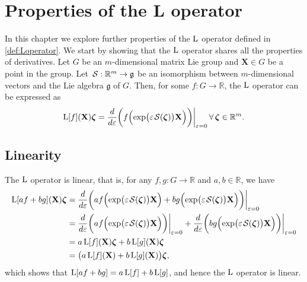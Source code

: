 \chapter{Properties of the L operator}\label{app:properties-L-op}
In this chapter we explore further properties of the $\operatorname{L}$ operator defined in \cref{def:Loperator}. We start by showing that the $\operatorname{L}$ operator shares all the properties of derivatives. Let $G$ be an $m$-dimensional matrix Lie group and $\mathbf{X}\in G$ be a point in the group. Let $\SL:\mathbb{R}^m\to\mathfrak{g}$ be an isomorphism between $m$-dimensional vectors and the Lie algebra $\mathfrak{g}$ of $G$. Then, for some $f:G\to \mathbb{R}$, the $\operatorname{L}$ operator can be expressed as
\begin{align}
    \Lop[f](\mathbf{X})\boldsymbol{\zeta} = \frac{d}{d\varepsilon}\biggl(f\Bigl(\exp\bigl(\varepsilon\SL[\boldsymbol{\zeta}]\bigr)\mathbf{X}\Bigr)\biggr)\biggr|_{\varepsilon=0}\,\forall\,\boldsymbol{\zeta}\in\mathbb{R}^m. \label{eq:appendix-prop-Lop-definition-L}
\end{align}
\section{Linearity}
The $\operatorname{L}$ operator is linear, that is, for any $f,g:G\to \mathbb{R}$ and $a,b\in\mathbb{R}$, we have
\begin{align}
    \begin{split}
        \Lop[a f + b g](\mathbf{X})\boldsymbol{\zeta} &= \frac{d}{d\varepsilon}\biggl(a f\Bigl(\exp\bigl(\varepsilon\SL[\boldsymbol{\zeta}]\bigr)\mathbf{X}\Bigr) + b g\Bigl(\exp\bigl(\varepsilon\SL[\boldsymbol{\zeta}]\bigr)\mathbf{X}\Bigr)\biggr)\biggr|_{\varepsilon=0}\\
        &= \frac{d}{d\varepsilon}\biggl(a f\Bigl(\exp\bigl(\varepsilon\SL[\boldsymbol{\zeta}]\bigr)\mathbf{X}\Bigr)\biggr)\biggr|_{\varepsilon=0} +  \frac{d}{d\varepsilon}\biggl(b g\Bigl(\exp\bigl(\varepsilon\SL[\boldsymbol{\zeta}]\bigr)\mathbf{X}\Bigr)\biggr)\biggr|_{\varepsilon=0}\\
        &= a \Lop[f](\mathbf{X})\boldsymbol{\zeta} + b \Lop[g](\mathbf{X})\boldsymbol{\zeta}\\
        &= \bigl(a \Lop[f](\mathbf{X}) + b \Lop[g](\mathbf{X})\bigr)\boldsymbol{\zeta},
    \end{split}
\end{align}
which shows that $\operatorname{L}[a f + b g] = a \operatorname{L}[f] + b \operatorname{L}[g]$, and hence the $\operatorname{L}$ operator is linear.
